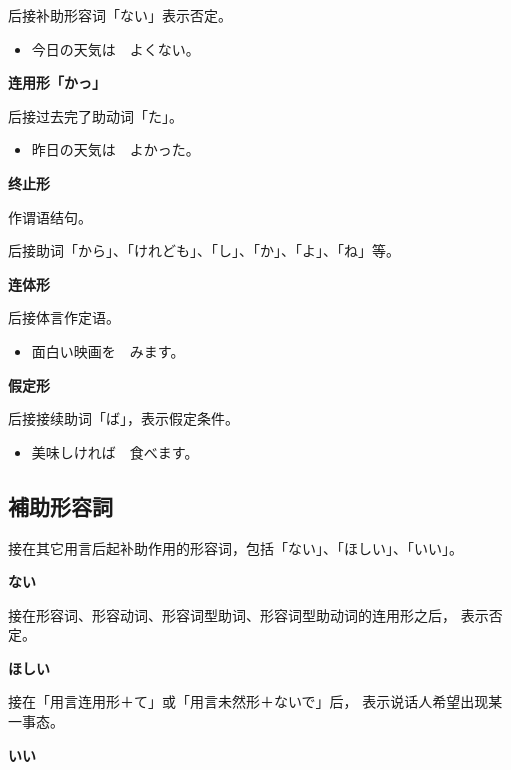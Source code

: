 后接补助形容词「ない」表示否定。
\begin{itemize}
  \item 今日の天気は　よくない。
\end{itemize}

{\bf
\noindent 连用形「かっ」
}

后接过去完了助动词「た」。
\begin{itemize}
  \item 昨日の天気は　よかった。
\end{itemize}

{\bf
\noindent 终止形
}

作谓语结句。

后接助词「から」、「けれども」、「し」、「か」、「よ」、「ね」等。

{\bf
\noindent 连体形
}

后接体言作定语。
\begin{itemize}
  \item 面白い映画を　みます。
\end{itemize}

{\bf
\noindent 假定形
}

后接接续助词「ば」，表示假定条件。
\begin{itemize}
  \item 美味しければ　食べます。
\end{itemize}


\subsection{補助形容詞}%

接在其它用言后起补助作用的形容词，包括「ない」、「ほしい」、「いい」。

{\bf
\noindent ない
}

接在形容词、形容动词、形容词型助词、形容词型助动词的连用形之后，
表示否定。

{\bf
\noindent ほしい
}

接在「用言连用形＋て」或「用言未然形＋ないで」后，
表示说话人希望出现某一事态。

{\bf
\noindent いい
}



